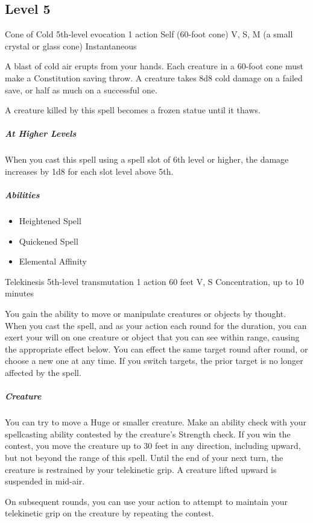 \documentclass[a4paper,openany,twocolumn]{book}
\begin{document}
\subsection*{Level 5}

\DndSpellHeader
  {Cone of Cold}
  {5th-level evocation}
  {1 action}
  {Self (60-foot cone)}
  {V, S, M (a small crystal or glass cone)}
  {Instantaneous}

A blast of cold air erupts from your hands. Each creature in a 60-foot cone must make a Constitution saving throw. A creature takes 8d8 cold damage on a failed save, or half as much on a successful one.

A creature killed by this spell becomes a frozen statue until it thaws.

\subparagraph*{At Higher Levels} When you cast this spell using a spell slot of 6th level or higher, the damage increases by 1d8 for each slot level above 5th.

\subparagraph*{Abilities}
\begin{itemize}
  \item Heightened Spell
  \item Quickened Spell
  \item Elemental Affinity
\end{itemize}

\DndSpellHeader
  {Telekinesis}
  {5th-level transmutation}
  {1 action}
  {60 feet}
  {V, S}
  {Concentration, up to 10 minutes}

You gain the ability to move or manipulate creatures or objects by thought. When you cast the spell, and as your action each round for the duration, you can exert your will on one creature or object that you can see within range, causing the appropriate effect below. You can effect the same target round after round, or choose a new one at any time. If you switch targets, the prior target is no longer affected by the spell.

\subparagraph*{Creature} You can try to move a Huge or smaller creature. Make an ability check with your spellcasting ability contested by the creature's Strength check. If you win the contest, you move the creature up to 30 feet in any direction, including upward, but not beyond the range of this spell. Until the end of your next turn, the creature is restrained by your telekinetic grip. A creature lifted upward is suspended in mid-air.

On subsequent rounds, you can use your action to attempt to maintain your telekinetic grip on the creature by repeating the contest.
\end{document}
